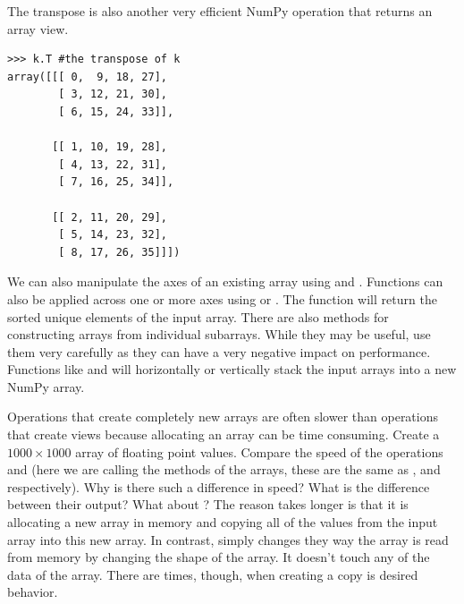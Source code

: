 The transpose is also another very efficient NumPy operation that returns an array view.   
\begin{lstlisting}
>>> k.T #the transpose of k
array([[[ 0,  9, 18, 27],
        [ 3, 12, 21, 30],
        [ 6, 15, 24, 33]],

       [[ 1, 10, 19, 28],
        [ 4, 13, 22, 31],
        [ 7, 16, 25, 34]],

       [[ 2, 11, 20, 29],
        [ 5, 14, 23, 32],
        [ 8, 17, 26, 35]]])
\end{lstlisting}
We can also manipulate the axes of an existing array using  and .
Functions can also be applied across one or more axes using  or .  
The function  will return the sorted unique elements of the input array.
There are also methods for constructing arrays from individual subarrays.
While they may be useful, use them very carefully as they can have a very negative impact on performance.
Functions like  and  will horizontally or vertically stack the input arrays into a new NumPy array.

\begin{problem}
Operations that create completely new arrays are often slower than operations that create views because allocating an array can be time consuming.
Create a $1000 \times 1000$ array  of floating point values.
Compare the speed of the operations  and  (here we are calling the methods of the arrays, these are the same as , and  respectively).
Why is there such a difference in speed?
What is the difference between their output?
What about ?
The reason  takes longer is that it is allocating a new array in memory and copying all of the values from the input array into this new array.  In contrast,  simply changes they way the array is read from memory by changing the shape of the array.  It doesn't touch any of the data of the array.  There are times, though, when creating a copy is desired behavior.
\end{problem}

